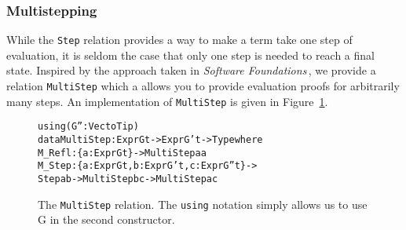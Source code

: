 



\subsubsection{Multistepping}
While the \texttt{Step} relation provides a way to make a term take one step of evaluation, it is seldom the case that only one step is needed to reach a final state. Inspired by the approach taken in \textit{Software Foundations}\,\cite{Pierce:SF}, we provide a relation \texttt{MultiStep} which a allows you to provide evaluation proofs for arbitrarily many steps. An implementation of \texttt{MultiStep} is given in Figure~\ref{fig:MultiStep}.

\begin{figure}
\begin{alltt}
using (G'': Vect o Tip)
  data MultiStep : Expr G t -> Expr G' t -> Type where
     M_Refl : \{a: Expr G t\} -> MultiStep a a
     M_Step : \{a: Expr G t, b: Expr G' t, c: Expr G'' t\} -> 
              Step a b -> MultiStep b c -> MultiStep a c
\end{alltt}
\caption{The \texttt{MultiStep} relation. The \texttt{using} notation simply allows us to use G in the second constructor.}
\label{fig:MultiStep}
\end{figure}

